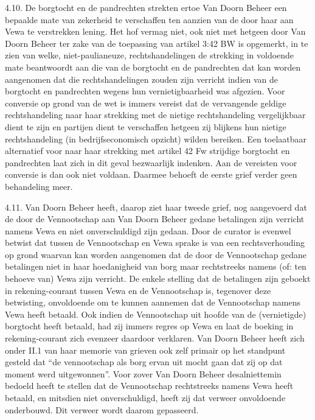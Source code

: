 \documentclass[
  dutch,
  a4paper,
]{article}
\begin{document}
4.10. De borgtocht en de pandrechten strekten ertoe Van Doorn Beheer een bepaalde mate van zekerheid te verschaffen ten aanzien van de door haar aan Vewa te verstrekken lening. Het hof vermag niet, ook niet met hetgeen door Van Doorn Beheer ter zake van de toepassing van artikel 3:42 BW is opgemerkt, in te zien van welke, niet-paulianeuze, rechtshandelingen de strekking in voldoende mate beantwoordt aan die van de borgtocht en de pandrechten dat kan worden aangenomen dat die rechtshandelingen zouden zijn verricht indien van de borgtocht en pandrechten wegens hun vernietigbaarheid was afgezien. Voor conversie op grond van de wet is immers vereist dat de vervangende geldige rechtshandeling naar haar strekking met de nietige rechtshandeling vergelijkbaar dient te zijn en partijen dient te verschaffen hetgeen zij blijkens hun nietige rechtshandeling (in bedrijfseconomisch opzicht) wilden bereiken. Een toelaatbaar alternatief voor naar haar strekking met artikel 42 Fw strijdige borgtocht en pandrechten laat zich in dit geval bezwaarlijk indenken. Aan de vereisten voor conversie is dan ook niet voldaan. Daarmee behoeft de eerste grief verder geen behandeling meer.

4.11. Van Doorn Beheer heeft, daarop ziet haar tweede grief, nog aangevoerd dat de door de Vennootschap aan Van Doorn Beheer gedane betalingen zijn verricht namens Vewa en niet onverschuldigd zijn gedaan. Door de curator is evenwel betwist dat tussen de Vennootschap en Vewa sprake is van een rechtsverhouding op grond waarvan kan worden aangenomen dat de door de Vennootschap gedane betalingen niet in haar hoedanigheid van borg maar rechtstreeks namens (of: ten behoeve van) Vewa zijn verricht. De enkele stelling dat de betalingen zijn geboekt in rekening-courant tussen Vewa en de Vennootschap is, tegenover deze betwisting, onvoldoende om te kunnen aannemen dat de Vennootschap namens Vewa heeft betaald. Ook indien de Vennootschap uit hoofde van de (vernietigde) borgtocht heeft betaald, had zij immers regres op Vewa en laat de boeking in rekening-courant zich evenzeer daardoor verklaren. Van Doorn Beheer heeft zich onder II.1 van haar memorie van grieven ook zelf primair op het standpunt gesteld dat ``de vennootschap als borg ervan uit mocht gaan dat zij op dat moment werd uitgewonnen''. Voor zover Van Doorn Beheer desalniettemin bedoeld heeft te stellen dat de Vennootschap rechtstreeks namens Vewa heeft betaald, en mitsdien niet onverschuldigd, heeft zij dat verweer onvoldoende onderbouwd. Dit verweer wordt daarom gepasseerd.
\end{document}
